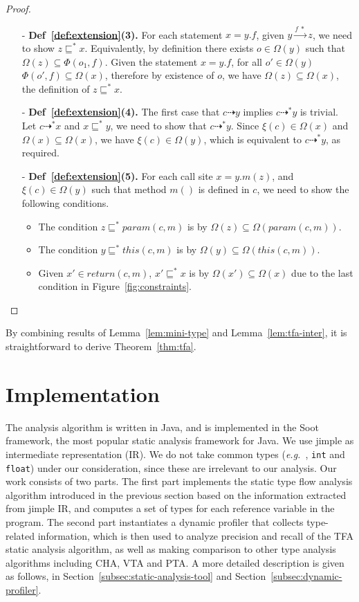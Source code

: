 \documentclass{fac}
\newcommand\eg{\textit{e.g.\ }}
\newcommand{\VPT}{\Omega}
\newcommand{\HPT}{\Phi}
\newcommand{\less}{\sqsubseteq}
\newcommand{\tflow}{\dashrightarrow}
\newcommand{\hflow}{\longrightarrow}
\newcommand{\lhflow}[1]{\stackrel{#1}{\hflow}}
\begin{document}
\begin{proof}
\begin{itemize}
\item[-] \textbf{Def~\ref{def:extension}(3).} For each statement $x = y.f$, given $y\lhflow{f\ *}z$, we need to show $z\less^* x$. Equivalently, by definition there exists $o\in\VPT(y)$ such that $\VPT(z)\subseteq\HPT(o_1,f)$. Given the statement $x = y.f$, for all $o'\in \VPT(y)$ $\HPT(o',f)\subseteq\VPT(x)$, therefore by existence of $o$, we have $\VPT(z)\subseteq\VPT(x)$, the definition of $z\less^* x$.
\item[-] \textbf{Def~\ref{def:extension}(4).} The first case that $c\tflow y$ implies $c\tflow^* y$ is trivial. Let $c\tflow^* x$ and $x\less^*y$, we need to show that $c\tflow^*y$. Since $\xi(c)\in\VPT(x)$ and $\VPT(x)\subseteq\VPT(x)$, we have $\xi(c)\in\VPT(y)$, which is equivalent to $c\tflow^*y$, as required.

\item[-] \textbf{Def~\ref{def:extension}(5).} For each call site $x = y.m(z)$, and $\xi(c)\in\VPT(y)$ such that method $m()$ is defined in $c$, we need to show the following conditions.
      \begin{itemize}
      \item The condition $z\less^* param(c,m)$ is by $\VPT(z)\subseteq\VPT(param(c,m))$.
      \item The condition $y\less^*this(c,m)$ is by $\VPT(y)\subseteq\VPT(this(c,m))$.
      \item Given $x'\in return(c,m)$, $x'\less^* x$ is by $\VPT(x')\subseteq\VPT(x)$ due to the last condition in Figure~\ref{fig:constraints}.
      \end{itemize}
\end{itemize}
\end{proof}
By combining results of Lemma~\ref{lem:mini-type} and Lemma~\ref{lem:tfa-inter}, it is straightforward to derive Theorem~\ref{thm:tfa}.

\section{Implementation}\label{sec:implementation}
The analysis algorithm is written in Java, and is implemented in the Soot framework, the most popular static analysis framework for Java. We use jimple as intermediate representation (IR).
We do not take common types (\eg, \texttt{int} and \texttt{float}) under our consideration, since these are irrelevant to our analysis.
Our work consists of two parts. The first part implements the static type flow analysis algorithm introduced in the previous section based on the information extracted from jimple IR, and computes a set of types for each reference variable in the program. The second part instantiates a dynamic profiler that collects type-related information, which is then used to analyze precision and recall of the TFA static analysis algorithm, as well as making comparison to other type analysis algorithms including CHA, VTA and PTA. A more detailed description is given as follows, in Section~\ref{subsec:static-analysis-tool} and Section~\ref{subsec:dynamic-profiler}.
\end{document}
